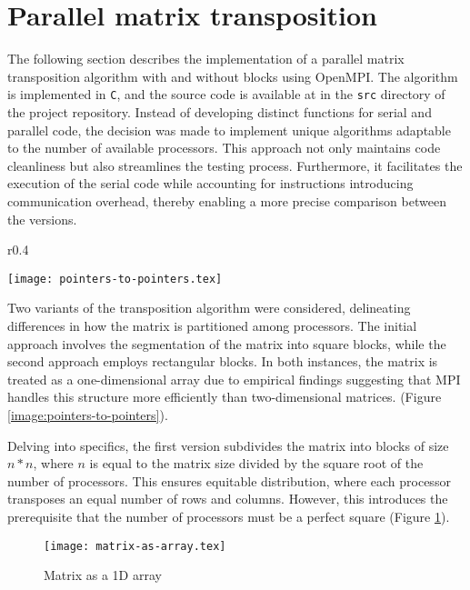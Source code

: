 \section*{\label{sec:transposition}Parallel matrix transposition}

The following section describes the implementation of a parallel matrix transposition algorithm with and %
without blocks using OpenMPI. The algorithm is implemented in \texttt{C}, and the source code is available at %
in the \texttt{src} directory of the project repository.
Instead of developing distinct functions for serial and parallel code, the decision was made to implement %
unique algorithms adaptable to the number of available processors. This approach not only maintains code %
cleanliness but also streamlines the testing process. Furthermore, it facilitates the execution of the serial %
code while accounting for instructions introducing communication overhead, thereby enabling a more precise %
comparison between the versions.

\setlength{\abovecaptionskip}{-5pt} %
\begin{wrapfigure}{r}{0.4\textwidth}
    \caption{\label{image:pointers-to-pointers}Array of pointers to arrays}
    \centering
    \texttt{[image: pointers-to-pointers.tex]}
\end{wrapfigure}

Two variants of the transposition algorithm were considered, delineating differences in how the matrix is %
partitioned among processors. The initial approach involves the segmentation of the matrix into square blocks, %
while the second approach employs rectangular blocks. In both instances, the matrix is treated as a one-dimensional %
array due to empirical findings suggesting that MPI handles this structure more efficiently than two-dimensional matrices. %
(Figure \ref{image:pointers-to-pointers}). %

Delving into specifics, the first version subdivides the matrix into blocks of size $n * n$, where $n$ is equal %
to the matrix size divided by the square root of the number of processors. This ensures equitable distribution, %
where each processor transposes an equal number of rows and columns. However, this introduces the prerequisite %
that the number of processors must be a perfect square (Figure \ref{image:matrix-as-array}).

\begin{figure}[h]
    \caption{\label{image:matrix-as-array}Matrix as a 1D array}
    \centering
    \texttt{[image: matrix-as-array.tex]}
\end{figure}


